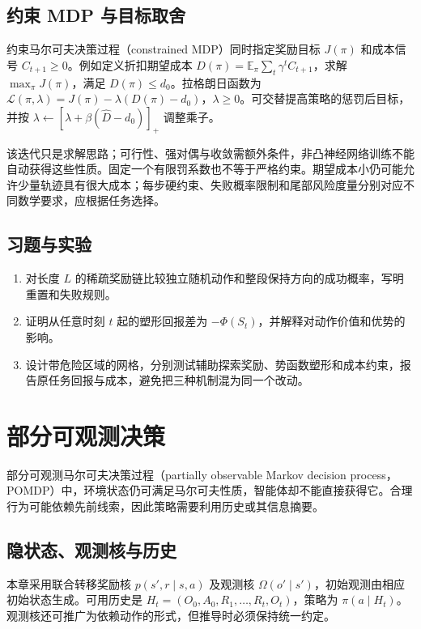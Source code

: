 \documentclass[UTF8,12pt,a4paper,fontset=fandol]{ctexbook}
\begin{document}
\section{约束 MDP 与目标取舍}

约束马尔可夫决策过程（constrained MDP）同时指定奖励目标 $J(\pi)$ 和成本信号 $C_{t+1}\geq0$。例如定义折扣期望成本 $D(\pi)=\mathbb E_\pi\sum_t\gamma^tC_{t+1}$，求解 $\max_\pi J(\pi)$，满足 $D(\pi)\leq d_0$。拉格朗日函数为 $\mathcal L(\pi,\lambda)=J(\pi)-\lambda(D(\pi)-d_0)$，$\lambda\geq0$。可交替提高策略的惩罚后目标，并按 $\lambda\leftarrow[\lambda+\beta(\widehat D-d_0)]_+$ 调整乘子。

该迭代只是求解思路；可行性、强对偶与收敛需额外条件，非凸神经网络训练不能自动获得这些性质。固定一个有限罚系数也不等于严格约束。期望成本小仍可能允许少量轨迹具有很大成本；每步硬约束、失败概率限制和尾部风险度量分别对应不同数学要求，应根据任务选择。

\section{习题与实验}
\begin{enumerate}
\item 对长度 $L$ 的稀疏奖励链比较独立随机动作和整段保持方向的成功概率，写明重置和失败规则。
\item 证明从任意时刻 $t$ 起的塑形回报差为 $-\Phi(S_t)$，并解释对动作价值和优势的影响。
\item 设计带危险区域的网格，分别测试辅助探索奖励、势函数塑形和成本约束，报告原任务回报与成本，避免把三种机制混为同一个改动。
\end{enumerate}

\chapter{部分可观测决策}
\label{ch:rl-pomdp}

部分可观测马尔可夫决策过程（partially observable Markov decision process，POMDP）中，环境状态仍可满足马尔可夫性质，智能体却不能直接获得它。合理行为可能依赖先前线索，因此策略需要利用历史或其信息摘要。

\section{隐状态、观测核与历史}

本章采用联合转移奖励核 $p(s',r\mid s,a)$ 及观测核 $\Omega(o'\mid s')$，初始观测由相应初始状态生成。可用历史是 $H_t=(O_0,A_0,R_1,\ldots,R_t,O_t)$，策略为 $\pi(a\mid H_t)$。观测核还可推广为依赖动作的形式，但推导时必须保持统一约定。
\end{document}
